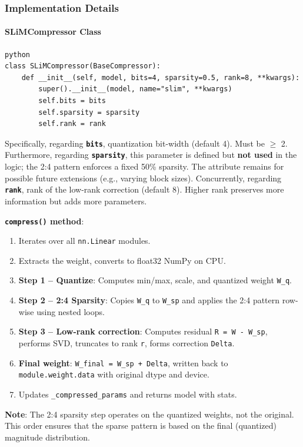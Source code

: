 \subsubsection*{Implementation Details}

\paragraph{SLiMCompressor Class}

\vspace{0.5em}
\begin{mdframed}[backgroundcolor=codebg, linecolor=codeframe, linewidth=1pt, roundcorner=4pt, innerleftmargin=2pt, innerrightmargin=5pt, innertopmargin=5pt, innerbottommargin=5pt]
\begin{lstlisting}
python
class SLiMCompressor(BaseCompressor):
    def __init__(self, model, bits=4, sparsity=0.5, rank=8, **kwargs):
        super().__init__(model, name="slim", **kwargs)
        self.bits = bits
        self.sparsity = sparsity
        self.rank = rank
\end{lstlisting}
\end{mdframed}
\vspace{0.5em}

Specifically, regarding \textbf{\texttt{bits}}, quantization bit-width (default 4). Must be $\ge$ 2. Furthermore, regarding \textbf{\texttt{sparsity}}, this parameter is defined but \textbf{not used} in the logic; the 2:4 pattern enforces a fixed 50\% sparsity. The attribute remains for possible future extensions (e.g., varying block sizes). Concurrently, regarding \textbf{\texttt{rank}}, rank of the low-rank correction (default 8). Higher rank preserves more information but adds more parameters.


\textbf{\texttt{compress()} method}:

\begin{enumerate}
\item Iterates over all \texttt{nn.Linear} modules.
\item Extracts the weight, converts to float32 NumPy on CPU.
\item \textbf{Step 1 -- Quantize}: Computes min/max, scale, and quantized weight \texttt{W\_q}.
\item \textbf{Step 2 -- 2:4 Sparsity}: Copies \texttt{W\_q} to \texttt{W\_sp} and applies the 2:4 pattern row-wise using nested loops.
\item \textbf{Step 3 -- Low-rank correction}: Computes residual \texttt{R = W - W\_sp}, performs SVD, truncates to rank \texttt{r}, forms correction \texttt{Delta}.
\item \textbf{Final weight}: \texttt{W\_final = W\_sp + Delta}, written back to \texttt{module.weight.data} with original dtype and device.
\item Updates \texttt{\_compressed\_params} and returns model with stats.

\end{enumerate}
\textbf{Note}: The 2:4 sparsity step operates on the quantized weights, not the original. This order ensures that the sparse pattern is based on the final (quantized) magnitude distribution.


